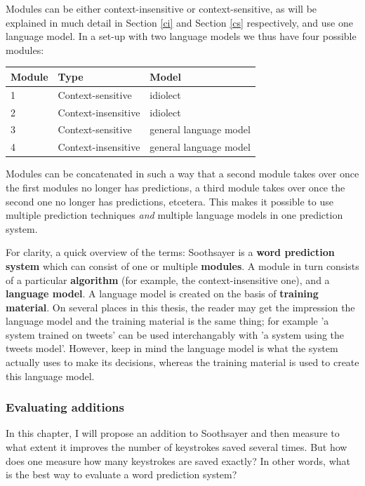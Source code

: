 \documentclass[11pt]{article}
\let\originaltable\table
\let\endoriginaltable\endtable
\renewenvironment{table}[1][ht]{%
  \originaltable[#1]
  \centering}%
  {\endoriginaltable}
\begin{document}
Modules can be either context-insensitive or context-sensitive, as will be explained in much detail in Section \ref{ci} and Section \ref{cs} respectively, and use one language model. In a set-up with two language models we thus have four possible modules:

\begin{table}[h]
\begin{tabular}{lll} 
Module&Type&Model\\
\hline
1&Context-sensitive&idiolect\\
2&Context-insensitive&idiolect\\
3&Context-sensitive&general language model\\
4&Context-insensitive&general language model\\
\end{tabular} 
\caption{A possible module set-up for Soothsayer}
\end{table}

Modules can be concatenated in such a way that a second module takes over once the first modules no longer has predictions, a third module takes over once the second one no longer has predictions, etcetera. This makes it possible to use multiple prediction techniques \emph{and} multiple language models in one prediction system.

For clarity, a quick overview of the terms: Soothsayer is a \textbf{word prediction system} which can consist of one or multiple \textbf{modules}. A module in turn consists of a particular \textbf{algorithm} (for example, the context-insensitive one), and a \textbf{language model}. A language model is created on the basis of \textbf{training material}. On several places in this thesis, the reader may get the impression the language model and the training material is the same thing; for example 'a system trained on tweets' can be used interchangably with 'a system using the tweets model'. However, keep in mind the language model is what the system actually uses to make its decisions, whereas the training material is used to create this language model.

\subsubsection{Evaluating additions} \label{evaluation}
In this chapter, I will propose an addition to Soothsayer and then measure to what extent it improves the number of keystrokes saved several times. But how does one measure how many keystrokes are saved exactly? In other words, what is the best way to evaluate a word prediction system?
\end{document}
